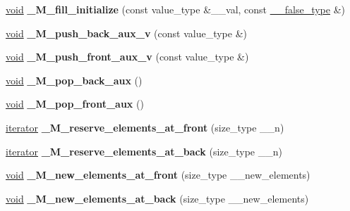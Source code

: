 \begin{DoxyCompactItemize}
\item 
\mbox{\label{classdeque_a1b0aef24cc15a56d40b14eaeec65c5c8}} 
\hyperlink{interfacevoid}{void} {\bfseries \+\_\+\+M\+\_\+fill\+\_\+initialize} (const value\+\_\+type \&\+\_\+\+\_\+val, const \hyperlink{struct____false__type}{\+\_\+\+\_\+false\+\_\+type} \&)
\item 
\mbox{\label{classdeque_a3f9c30cb73ab0c51b605e7b424981f7c}} 
\hyperlink{interfacevoid}{void} {\bfseries \+\_\+\+M\+\_\+push\+\_\+back\+\_\+aux\+\_\+v} (const value\+\_\+type \&)
\item 
\mbox{\label{classdeque_acc612edaf7a0cf84a9e50325202244c2}} 
\hyperlink{interfacevoid}{void} {\bfseries \+\_\+\+M\+\_\+push\+\_\+front\+\_\+aux\+\_\+v} (const value\+\_\+type \&)
\item 
\mbox{\label{classdeque_afd305a66ac1b6a6f76c05926c3db1e47}} 
\hyperlink{interfacevoid}{void} {\bfseries \+\_\+\+M\+\_\+pop\+\_\+back\+\_\+aux} ()
\item 
\mbox{\label{classdeque_a9b889af03611e37921d65cdfc658cb59}} 
\hyperlink{interfacevoid}{void} {\bfseries \+\_\+\+M\+\_\+pop\+\_\+front\+\_\+aux} ()
\item 
\mbox{\label{classdeque_ab20158c55e6090cde38fdcef06db3fda}} 
\hyperlink{structiterator}{iterator} {\bfseries \+\_\+\+M\+\_\+reserve\+\_\+elements\+\_\+at\+\_\+front} (size\+\_\+type \+\_\+\+\_\+n)
\item 
\mbox{\label{classdeque_a945cf31b7d7d3bf1650887cff2a71fa2}} 
\hyperlink{structiterator}{iterator} {\bfseries \+\_\+\+M\+\_\+reserve\+\_\+elements\+\_\+at\+\_\+back} (size\+\_\+type \+\_\+\+\_\+n)
\item 
\mbox{\label{classdeque_ad78ca6d06ee9fe298ed83f08872c8c1f}} 
\hyperlink{interfacevoid}{void} {\bfseries \+\_\+\+M\+\_\+new\+\_\+elements\+\_\+at\+\_\+front} (size\+\_\+type \+\_\+\+\_\+new\+\_\+elements)
\item 
\mbox{\label{classdeque_a472932717ea8ecaafeff1ec50f6f990b}} 
\hyperlink{interfacevoid}{void} {\bfseries \+\_\+\+M\+\_\+new\+\_\+elements\+\_\+at\+\_\+back} (size\+\_\+type \+\_\+\+\_\+new\+\_\+elements)

\end{DoxyCompactItemize}
